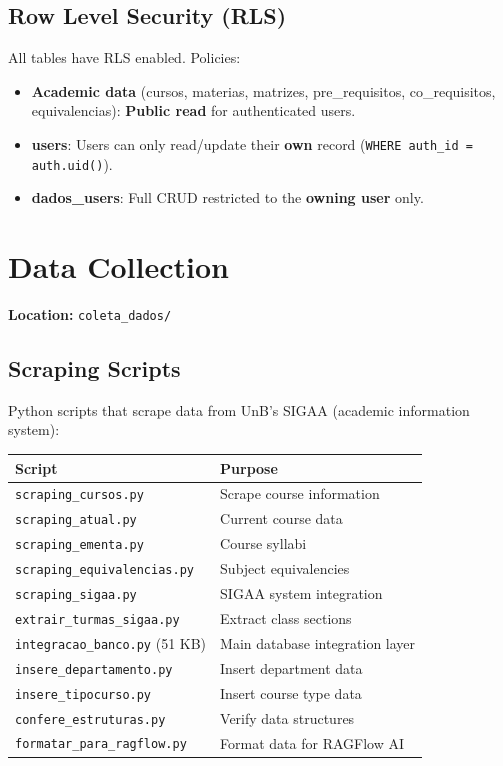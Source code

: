 \documentclass[11pt,a4paper]{article}
\newcommand{\code}[1]{\texttt{#1}}
\begin{document}
\subsection{Row Level Security (RLS)}

All tables have RLS enabled. Policies:
\begin{itemize}[noitemsep]
    \item \textbf{Academic data} (cursos, materias, matrizes, pre\_requisitos,
    co\_requisitos, equivalencias): \textbf{Public read} for authenticated users.
    \item \textbf{users}: Users can only read/update their \textbf{own} record
    (\code{WHERE auth\_id = auth.uid()}).
    \item \textbf{dados\_users}: Full CRUD restricted to the \textbf{owning user} only.
\end{itemize}

\section{Data Collection}

\noindent\textbf{Location:} \code{coleta\_dados/}

\subsection{Scraping Scripts}

Python scripts that scrape data from UnB's SIGAA (academic information system):

\begin{center}
\begin{longtable}{@{}L{5.5cm}L{7cm}@{}}
\toprule
\textbf{Script} & \textbf{Purpose} \\
\midrule
\endhead
\code{scraping\_cursos.py}        & Scrape course information \\
\code{scraping\_atual.py}         & Current course data \\
\code{scraping\_ementa.py}        & Course syllabi \\
\code{scraping\_equivalencias.py} & Subject equivalencies \\
\code{scraping\_sigaa.py}         & SIGAA system integration \\
\code{extrair\_turmas\_sigaa.py}   & Extract class sections \\
\code{integracao\_banco.py} (51 KB) & Main database integration layer \\
\code{insere\_departamento.py}    & Insert department data \\
\code{insere\_tipocurso.py}       & Insert course type data \\
\code{confere\_estruturas.py}     & Verify data structures \\
\code{formatar\_para\_ragflow.py}  & Format data for RAGFlow AI \\
\bottomrule
\end{longtable}
\end{center}
\end{document}
